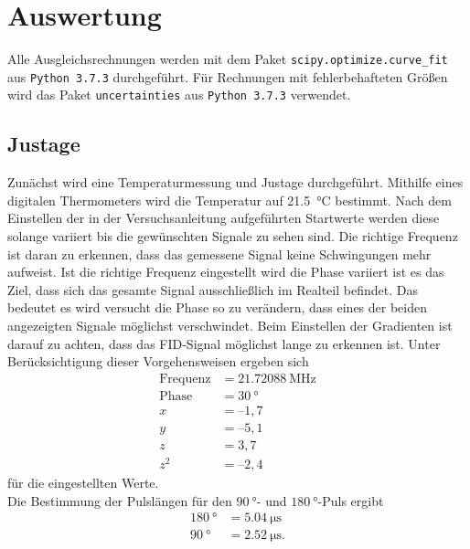 \section{Auswertung}

Alle Ausgleichsrechnungen werden mit dem Paket \texttt{scipy.optimize.curve\_fit}  aus \texttt{Python 3.7.3} durchgeführt.
Für Rechnungen mit fehlerbehafteten Größen wird das Paket \texttt{uncertainties} aus \texttt{Python 3.7.3} verwendet.\\

\subsection{Justage}
Zunächst wird eine Temperaturmessung und Justage durchgeführt. Mithilfe eines digitalen Thermometers wird die Temperatur
auf \SI{21.5}{\degreeCelsius} bestimmt. Nach dem Einstellen der in der Versuchsanleitung \cite{anleitung} aufgeführten Startwerte
werden diese solange variiert bis die gewünschten Signale zu sehen sind.
Die richtige Frequenz ist daran zu erkennen, dass das gemessene Signal keine Schwingungen mehr aufweist. Ist die richtige Frequenz
eingestellt wird die Phase variiert ist es das Ziel, dass sich das gesamte Signal ausschließlich im Realteil befindet.
Das bedeutet es wird versucht die Phase so zu verändern, dass eines der beiden angezeigten Signale möglichst verschwindet.
Beim Einstellen der Gradienten ist darauf zu achten, dass das FID-Signal möglichst lange zu erkennen ist.
Unter Berücksichtigung dieser Vorgehensweisen ergeben sich
\begin{align*}
  \text{Frequenz}&=\SI{21.72088}{\mega\hertz} \\
  \text{Phase} &= \SI{30}{\degree} \\
    x&=–1,7 \\
    y&=–5,1 \\
    z&=3,7 \\
    z^2 &=–2,4
\end{align*} \noindent
für die eingestellten Werte. \\
Die Bestimmung der Pulslängen für den $\SI{90}{\degree}$- und $\SI{180}{\degree}$-Puls ergibt
\begin{align*}
  \SI{180}{\degree} &= \SI{5.04}{\micro\second}\\
  \SI{90}{\degree}  &= \SI{2.52}{\micro\second}.
\end{align*} \noindent

